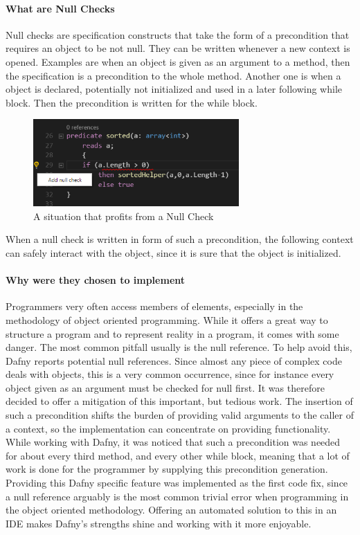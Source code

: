 \paragraph{What are Null Checks}
Null checks are specification constructs that take the form of a precondition that requires an object to be not null. They can be written whenever a new context is opened. Examples are when an object is given as an argument to a method, then the specification is a precondition to the whole method. Another one is when a object is declared, potentially not initialized and used in a later following while block. Then the precondition is written for the while block.\newline
\begin{figure}[H]
	\centering
	\includegraphics[width=0.7\textwidth]{img/nullCheck}
	\caption{A situation that profits from a Null Check}
	\label{fig:dfnullcheck}
\end{figure}
When a null check is written in form of such a precondition, the following context can safely interact with the object, since it is sure that the object is initialized. 
\paragraph{Why were they chosen to implement}
Programmers very often access members of elements, especially in the methodology of object oriented programming. While it offers a great way to structure a program and to represent reality in a program, it comes with some danger. The most common pitfall usually is the null reference. To help avoid this, Dafny reports potential null references. Since almost any piece of complex code deals with objects, this is a very common occurrence, since for instance every object given as an argument must be checked for null first. \newline
It was therefore decided to offer a mitigation of this important, but tedious work. The insertion of such a precondition shifts the burden of providing valid arguments to the caller of a context, so the implementation can concentrate on providing functionality. While working with Dafny, it was noticed that such a precondition was needed for about every third method, and every other while block, meaning that a lot of work is done for the programmer by supplying this precondition generation.
\newline
Providing this Dafny specific feature was implemented as the first code fix, since a null reference arguably is the most common trivial error when programming in the object oriented methodology. Offering an automated solution to this in an IDE makes Dafny's strengths shine and working with it more enjoyable.
